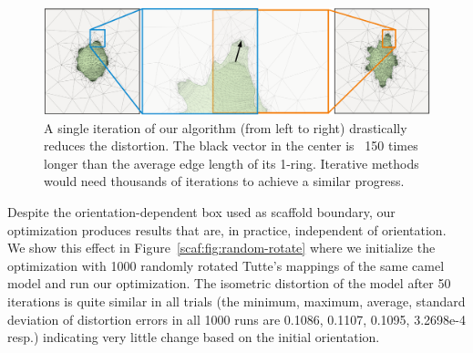 \begin{figure}[t]
\centering
\includegraphics[width=\columnwidth]{scaf-tex/figs/camel_step.pdf}
\caption{A single iteration of our algorithm (from left to right) drastically reduces the distortion. The black vector in the center is ~150 times longer than the average edge length of its 1-ring. Iterative methods would need thousands of iterations to achieve a similar progress.}
\vspace{-0.3cm}
\label{scaf:fig:largestep}
\end{figure}

Despite the orientation-dependent box used as scaffold boundary, our optimization produces results that are, in practice, independent of orientation.  We show this effect in Figure~\ref{scaf:fig:random-rotate} where we initialize the optimization with 1000 randomly rotated Tutte's mappings of the same camel model and run our optimization.  The isometric distortion of the model after 50 iterations is quite similar in all trials (the minimum, maximum, average, standard deviation of distortion errors in all 1000 runs are 0.1086, 0.1107, 0.1095, 3.2698e-4 resp.) indicating very little change based on the initial orientation.

